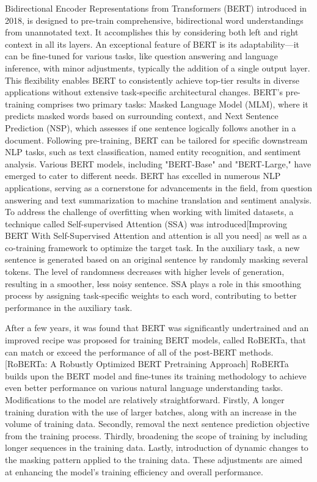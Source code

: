 \documentclass[conference]{IEEEtran}
\begin{document}
Bidirectional Encoder Representations from Transformers (BERT) introduced in 2018, is designed to pre-train comprehensive, bidirectional word understandings from unannotated text. It accomplishes this by considering both left and right context in all its layers. An exceptional feature of BERT is its adaptability—it can be fine-tuned for various tasks, like question answering and language inference, with minor adjustments, typically the addition of a single output layer. This flexibility enables BERT to consistently achieve top-tier results in diverse applications without extensive task-specific architectural changes. BERT's pre-training comprises two primary tasks: Masked Language Model (MLM), where it predicts masked words based on surrounding context, and Next Sentence Prediction (NSP), which assesses if one sentence logically follows another in a document. Following pre-training, BERT can be tailored for specific downstream NLP tasks, such as text classification, named entity recognition, and sentiment analysis. Various BERT models, including "BERT-Base" and "BERT-Large," have emerged to cater to different needs. BERT has excelled in numerous NLP applications, serving as a cornerstone for advancements in the field, from question answering and text summarization to machine translation and sentiment analysis.
To address the challenge of overfitting when working with limited datasets, a technique called Self-supervised Attention (SSA) was introduced[Improving BERT With Self-Supervised Attention
 and attention is all you need] as well as a co-training framework to optimize the target task. In the auxiliary task, a new sentence is generated based on an original sentence by randomly masking several tokens. The level of randomness decreases with higher levels of generation, resulting in a smoother, less noisy sentence. SSA plays a role in this smoothing process by assigning task-specific weights to each word, contributing to better performance in the auxiliary task.

After a few years, it was found that BERT was significantly undertrained and an improved recipe was proposed for training BERT models, called RoBERTa, that can match or exceed the performance of all of the post-BERT methods.[RoBERTa: A Robustly Optimized BERT Pretraining Approach] RoBERTa builds upon the BERT model and fine-tunes its training methodology to achieve even better performance on various natural language understanding tasks. Modifications to the model are relatively straightforward. Firstly, A longer training duration with the use of larger batches, along with an increase in the volume of training data. Secondly, removal the next sentence prediction objective from the training process. Thirdly, broadening the scope of training by including longer sequences in the training data. Lastly, introduction of dynamic changes to the masking pattern applied to the training data. These adjustments are aimed at enhancing the model's training efficiency and overall performance.
\end{document}
